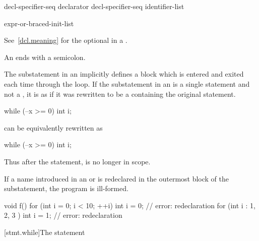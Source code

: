 \begin{bnf}
\br
     decl-specifier-seq declarator\br
     decl-specifier-seq  \terminal{[} identifier-list \terminal{]}
\end{bnf}

\begin{bnf}
\br
    expr-or-braced-init-list
\end{bnf}

See~\ref{dcl.meaning} for the optional  in a
.
\begin{note}
An  ends with a semicolon.
\end{note}

\pnum
{}%
The substatement in an  implicitly defines
a block  which is entered and exited each time
through the loop.
If the substatement in an  is
a single statement and not a ,
it is as if it was rewritten to be
a  containing the original statement.
\begin{example}
\begin{codeblock}
while (--x >= 0)
  int i;
\end{codeblock}
can be equivalently rewritten as
\begin{codeblock}
while (--x >= 0) {
  int i;
}
\end{codeblock}

Thus after the  statement,  is no longer in scope.
\end{example}

\pnum
If a name introduced in an
 or 
is redeclared in the outermost block of the substatement, the program is ill-formed.
\begin{example}
\begin{codeblock}
void f() {
  for (int i = 0; i < 10; ++i)
    int i = 0;          // error: redeclaration
  for (int i : { 1, 2, 3 })
    int i = 1;          // error: redeclaration
}
\end{codeblock}
\end{example}

[stmt.while]{The  statement}%

